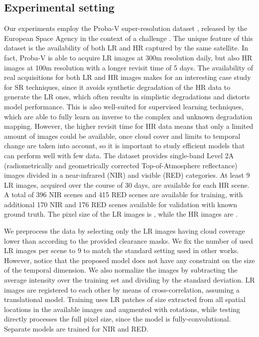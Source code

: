 \documentclass[journal]{IEEEtran}
\begin{document}
\subsection{Experimental setting}
Our experiments employ the Proba-V super-resolution dataset \cite{martens2019super}, released by the European Space Agency in the context of a challenge \cite{web:kelvins}. The unique feature of this dataset is the availability of both LR and HR captured by the same satellite. In fact, Proba-V is able to acquire LR images at 300m resolution daily, but also HR images at 100m resolution with a longer revisit time of 5 days. The availability of real acquisitions for both LR and HR images makes for an interesting case study for SR techniques, since it avoids synthetic degradation of the HR data to generate the LR ones, which often results in simplistic degradations and distorts model performance. This is also well-suited for supervised learning techniques, which are able to fully learn an inverse to the complex and unknown degradation mapping. However, the higher revisit time for HR data means that only a limited amount of images could be available, once cloud cover and limits to temporal change are taken into account, so it is important to study efficient models that can perform well with few data. 
The dataset provides single-band Level 2A (radiometrically and geometrically corrected Top-of-Atmosphere  reflectance) images divided in a near-infrared (NIR) and visible (RED) categories. At least 9 LR images, acquired over the course of 30 days, are available for each HR scene. A total of 396 NIR scenes and 415 RED scenes are available for training, with additional 170 NIR and 176 RED scenes available for validation with known ground truth. The pixel size of the LR images is , while the HR images are .

We preprocess the data by selecting only the LR images having cloud coverage lower than  according to the provided clearance masks. We fix the number of used LR images per scene to 9 to match the standard setting used in other works. However, notice that the proposed model does not have any constraint on the size of the temporal dimension.  We also normalize the images by subtracting the average intensity over the training set and dividing by the standard deviation. LR images are registered to each other by means of cross-correlation, assuming a translational model. 
Training uses LR patches of size  extracted from all spatial locations in the available images and augmented with rotations, while testing directly processes the full pixel size, since the model is fully-convolutional. Separate models are trained for NIR and RED.
\end{document}
